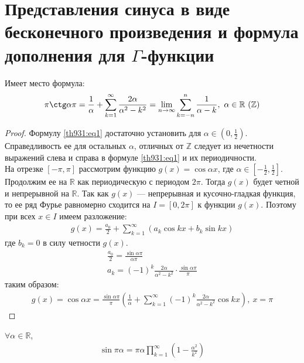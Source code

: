 \section{Представления синуса в виде бесконечного произведения и формула
дополнения для $\Gamma$-функции}
\begin{theorem}
  Имеет место формула:
  \begin{gather}
    \pi \ctg \alpha \pi = \frac{1}{\alpha} + \sum\limits_{k = 1}^{\infty}
    \frac{2\alpha}{\alpha^2 - k^2} = \lim\limits_{n \to \infty} \sum\limits_{k
    = -n}^{n} \frac{1}{\alpha - k}, \ \alpha \in \mathbb{R} \ (\mathbb{Z})
    \label{th931:eq1}
  \end{gather}
\end{theorem}
\begin{proof}
  Формулу \eqref{th931:eq1} достаточно установить для $\alpha \in (0,
  \frac{1}{2})$. Справедливость ее для остальных $\alpha$, отличных от
  $\mathbb{Z}$ следует из нечетности выражений слева и справа в формуле
  \eqref{th931:eq1} и их периодичности. \\ На отрезке $[-\pi, \pi]$ рассмотрим
  функцию $g(x) = \cos \alpha x$, где $\alpha \in [-\frac{1}{2}, \frac{1}{2}]$.
  Продолжим ее на $\mathbb{R}$ как периодическую с периодом $2\pi$.
  Тогда $g(x)$ будет четной и непрерывной на $\mathbb{R}$. Так как $g(x)$ ---
  непрерывная и кусочно-гладкая функция, то ее ряд Фурье равномерно сходится на
  $I = [0, 2\pi]$ к функции $g(x)$. Поэтому при всех $x \in I$ имеем разложение:
  \begin{gather*}
    g(x) = \frac{a_0}{2} + \sum\limits_{k = 1}^{\infty} (a_k \cos kx + b_k
    \sin kx)
  \end{gather*}
  где $b_k = 0$ в силу четности $g(x)$.
  \begin{gather*}
    \frac{a_0}{2} = \frac{\sin \alpha \pi}{\alpha \pi} \\
    a_k = (-1)^k \frac{2\alpha}{\alpha^2 - k^2} \cdot \frac{\sin \alpha
    \pi}{\pi}
  \end{gather*}
  таким образом:
  \begin{gather*}
    g(x) = \cos \alpha x = \frac{\sin \alpha \pi}{\pi} \left(\frac{1}{\alpha} +
    \sum\limits_{k = 1}^{\infty} (-1)^k \frac{2\alpha}{\alpha^2 - k^2} \cos kx
    \right), \ x = \pi
  \end{gather*}
\end{proof}

\begin{theorem}[Эйлера]
  $\forall \alpha \in \mathbb{R}$,
  \begin{gather}
    \sin \pi \alpha = \pi \alpha \prod\limits_{k = 1}^\infty \left(1 -
    \frac{\alpha^2}{k^2}\right)
    \label{th932:eq1}
  \end{gather}
\end{theorem}

